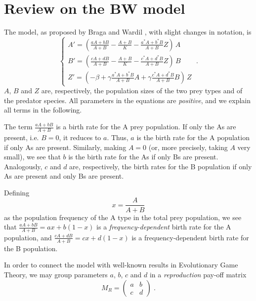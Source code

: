 \documentclass[12pt]{article}
\theoremstyle{definition}
\begin{document}
\section{Review on the BW model}\label{sec:rev}
The model, as proposed by Braga and Wardil \cite{bw}, with slight changes in notation, is 
\begin{equation} \label{modelorig}
	\begin{cases} 
		A' =  \left( \frac{aA + bB}{A + B} - \frac{A + B}{K} - \frac{a^*A + b^*B}{A + B}Z \right) \,A \\%
		B' = \left( \frac{cA + dB}{A + B} - \frac{A + B}{K} - \frac{c^*A + d^*B}{A + B}Z \right)\, B \\%
		Z' = \left( -\beta + \gamma \frac{a^*A + b^*B}{A + B}A + \gamma \frac{c^*A + d^*B}{A + B}B \right) \,Z
	\end{cases}\;.
\end{equation}
$A$, $B$ and $Z$ are, respectively, the population sizes of the two prey types and of the predator species. All parameters in the equations are \textit{positive}, and we explain all terms in the following.

The term $\frac{aA + bB}{A + B}$ is a birth rate for the A prey population. If only the As are present, i.e. $B=0$, it reduces to $a$. Thus, $a$ is the birth rate for the A population if only As are present. Similarly, making $A=0$ (or, more precisely, taking $A$ very small), we see that $b$ is the birth rate for the As if only Bs are present. Analogously, $c$ and $d$ are, respectively, the birth rates for the B population if only As are present and only Bs are present. 

Defining 
\begin{equation} \label{defx}
	x= \frac{A}{A+B}
\end{equation}
as the population frequency of the A type in the total prey population, we see that $\frac{aA + bB}{A + B}=ax+b(1-x)$ is a \emph{frequency-dependent} birth rate for the A population, and $\frac{cA + dB}{A + B}=cx+d(1-x)$ is a frequency-dependent birth rate for the B population. 

In order to connect the model with well-known results in Evolutionary Game Theory, we may group parameters $a$, $b$, $c$ and $d$ in a \emph{reproduction} pay-off matrix
\begin{equation}  \label{defrepmat}
	M_R=\begin{pmatrix}
		a & b \\
		c & d
	\end{pmatrix}\;.
\end{equation}
\end{document}
